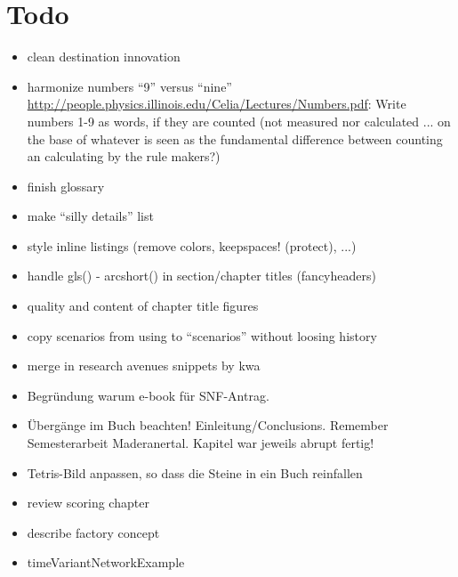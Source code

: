 \section*{Todo}

\begin{itemize}\styleItemize

\item clean destination innovation

\item harmonize numbers ``9'' versus ``nine'' \url{http://people.physics.illinois.edu/Celia/Lectures/Numbers.pdf}: Write numbers 1-9 as words, if they are counted (not measured nor calculated ... on the base of whatever is seen as the fundamental difference between counting an calculating by the rule makers?)

\item finish glossary

\item make ``silly details'' list

\item style inline listings (remove colors, keepspaces! (protect), ...)

\item handle gls() - arcshort() in section/chapter titles (fancyheaders)

\item quality and content of chapter title figures

\item copy scenarios from using to ``scenarios'' without loosing history

\item merge in research avenues snippets by kwa

\item Begründung warum e-book für SNF-Antrag.

\item Übergänge im Buch beachten! Einleitung/Conclusions. Remember Semesterarbeit Maderanertal. Kapitel war jeweils abrupt fertig!

\item Tetris-Bild anpassen, so dass die Steine in ein Buch reinfallen

\item review scoring chapter

\item describe factory concept

\item timeVariantNetworkExample


\end{itemize}
